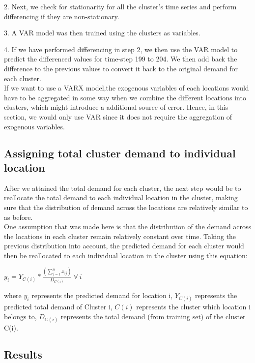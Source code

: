 \documentclass[nonblindrev,msom]{informs3} %
\begin{document}
2. Next, we check for stationarity for all the cluster's time series and perform differencing if they are non-stationary. 

3. A VAR model was then trained using the clusters as variables.

4. If we have performed differencing in step 2, we then use the VAR model to predict the differenced values for time-step 199 to 204. We then add back the difference to the previous values to convert it back to the original demand for each cluster. \\

\noindent If we want to use a VARX model,the exogenous variables of each locations would have to be aggregated in some way when we combine the different locations into clusters, which might introduce a additional source of error. Hence, in this section, we would only use VAR since it does not require the aggregation of exogenous variables.


\subsection{Assigning total cluster demand to individual location}

After we attained the total demand for each cluster, the next step would be to reallocate the total demand to each individual location in the cluster, making sure that the distribution of demand across the locations are relatively similar to as before. \\

\noindent One assumption that was made here is that the distribution of the demand across the locations in each cluster remain relatively constant over time. Taking the previous distribution into account, the predicted demand for each cluster would then be reallocated to each individual location in the cluster using this equation:

\begin{center}
    $\displaystyle y_{i} = Y_{C(i)} * \frac{(\sum_{j=1}^{n}x_{ij})}{D_{C(i)}} \: \forall \: i$
\end{center}

\noindent where $y_i$ represents the predicted demand for location i, $Y_{C(i)}$ represents the predicted total demand of Cluster i, $C(i)$ represents the cluster which location i belongs to, $D_{C(i)}$ represents the total demand (from training set) of the cluster C(i).


\subsection{Results}
\end{document}
